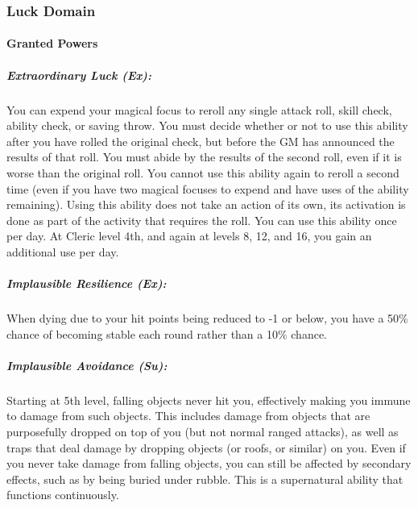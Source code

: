 \subsubsection{Luck Domain}
\paragraph{Granted Powers}
\subparagraph{Extraordinary Luck (Ex):}
You can expend your magical focus to reroll any single attack roll, skill check, ability check, or saving throw.
You must decide whether or not to use this ability after you have rolled the original check, but before the GM has announced the results of that roll.
You must abide by the results of the second roll, even if it is worse than the original roll.
You cannot use this ability again to reroll a second time (even if you have two magical focuses to expend and have uses of the ability remaining).
Using this ability does not take an action of its own, its activation is done as part of the activity that requires the roll.
You can use this ability once per day. At Cleric level 4th, and again at levels 8, 12, and 16, you gain an additional use per day.
\subparagraph{Implausible Resilience (Ex):} 
When dying due to your hit points being reduced to -1 or below, you have a 50\% chance of becoming stable each round rather than a 10\% chance.
\subparagraph{Implausible Avoidance (Su):} 
Starting at 5th level, falling objects never hit you, effectively making you immune to damage from such objects. This includes damage from objects that are purposefully dropped on top of you (but not normal ranged attacks), as well as traps that deal damage by dropping objects (or roofs, or similar) on you. Even if you never take damage from falling objects, you can still be affected by secondary effects, such as by being buried under rubble. This is a supernatural ability that functions continuously.
